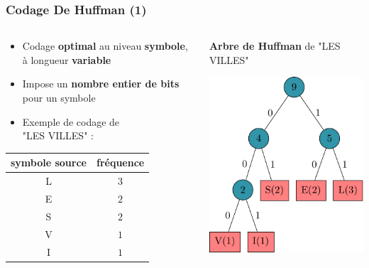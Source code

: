 \documentclass[aspectratio=43]{beamer}
\begin{document}
\begin{frame}
    \frametitle{Codage De Huffman (1)}

    \begin{columns}
        \begin{column}{0.5\textwidth}
            \centering

            \begin{itemize}
                \item Codage \textbf{optimal} au niveau \textbf{symbole}, à longueur \textbf{variable}
                \item Impose un \textbf{nombre entier de bits} pour un symbole
                \item Exemple de codage de \\ "LES VILLES" :
            \end{itemize}

            \vspace*{2em}

            \begin{tabular}{c | c}
                symbole source & fréquence \\
                \hline
                L & $3$ \\
                E & $2$ \\
                S & $2$ \\
                V & $1$ \\
                I & $1$ \\ \hline
            \end{tabular}
        \end{column}

        \begin{column}{0.5\textwidth}
            \textbf{Arbre de Huffman} de "LES VILLES"

            \vspace*{2em}

            \includegraphics{img/huffmanExample/huffmanExample.pdf}
        \end{column}
    \end{columns}
\end{frame}
\end{document}
